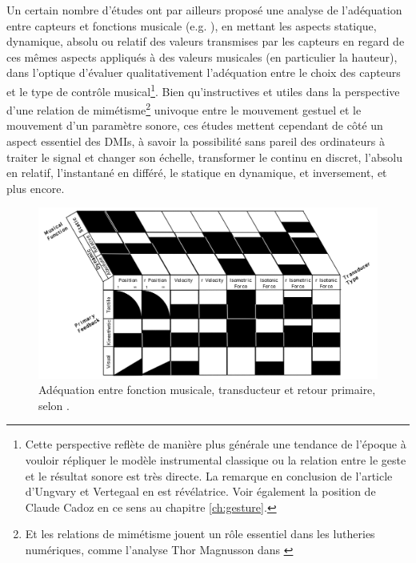 \noindent Un certain nombre d'études ont par ailleurs proposé une analyse de l'adéquation entre capteurs et fonctions musicale (e.g. \cite{vertegaal_towards_1996, goudeseune_interpolated_2002}), en mettant les aspects statique, dynamique, absolu ou relatif des valeurs transmises par les capteurs en regard de ces mêmes aspects appliqués à des valeurs musicales (en particulier la hauteur), dans l'optique d'évaluer qualitativement l'adéquation entre le choix des capteurs et le type de contrôle musical\footnote{Cette perspective reflète de manière plus générale une tendance de l'époque à vouloir répliquer le modèle instrumental classique ou la relation entre le geste et le résultat sonore est très directe. La remarque en conclusion de l'article d'Ungvary et Vertegaal  en est révélatrice. Voir également la position de Claude Cadoz en ce sens au chapitre \ref{ch:gesture}.}. Bien qu'instructives et utiles dans la perspective d'une relation de mimétisme\footnote{Et les relations de mimétisme jouent un rôle essentiel dans les lutheries numériques, comme l'analyse Thor Magnusson dans \cite{magnusson_ergomimesis_2018}} univoque entre le mouvement gestuel et le mouvement d'un paramètre sonore, ces études mettent cependant de côté un aspect essentiel des \glspl{DMI}, à savoir la possibilité sans pareil des ordinateurs à traiter le signal et changer son échelle, transformer le continu en discret, l'absolu en relatif, l'instantané en différé, le statique en dynamique, et inversement, et plus encore.\\
\begin{figure}[!htbp]
	\captionsetup{format=plain}%
	\includegraphics[width=\textwidth]{gfx/05_interfaces/vertegaal-musical-function.png}
	\caption[Adéquation entre fonction musicale, transducteur et retour primaire]{Adéquation entre fonction musicale, transducteur et retour primaire, selon \cite{vertegaal_towards_1996}.}
	\label{fig:interface:vertegaal-transducer-function}
\end{figure}
